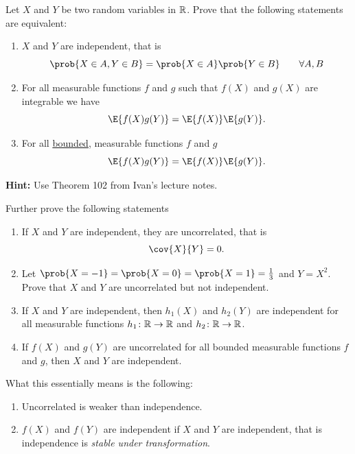 
\begin{exercise}[subtitle={Uncorrelated vs independent \Coffeecup\Coffeecup}]
   Let \(X\) and \(Y\) be two random variables in \(\mathbb{R}\). Prove that
   the following statements are equivalent:
   \begin{enumerate}[label=(\roman*),noitemsep]
        \item\label{it: independent} \(X\) and \(Y\) are independent, that is
        \[
            \prob{X \in A, Y \in B} = \prob{X \in A}\prob{Y \in B} \qquad \forall A, B
        \]
        \item\label{it: measurable functions} For all measurable functions \(f\) and \(g\) such that \(f(X)\)
        and \(g(X)\) are integrable we have
        \[
            \E{f(X)g(Y)} = \E{f(X)}\E{g(Y)}.
        \]
        \item\label{it: bounded measurable functions} For all \underline{bounded}, measurable functions \(f\) and \(g\)
        \[
            \E{f(X)g(Y)} = \E{f(X)}\E{g(Y)}.
        \]
   \end{enumerate}
   \textbf{Hint: } Use Theorem 102 from Ivan's lecture notes.
    
   \noindent Further prove the following statements
    \begin{enumerate}[label=(\alph*),noitemsep]
        \item\label{it: idep => uncor}
        If \(X\) and \(Y\) are independent, they are uncorrelated, that is
        \[
            \cov{X}{Y} = 0.
        \]

        \item\label{it: uncor not indep}
        Let \(\prob{X=-1} = \prob{X=0} = \prob{X=1} = \frac13\) and \(Y =
        X^2\). Prove that \(X\) and \(Y\) are uncorrelated but not independent.

        \item\label{it: indep stable under transformation}
        If \(X\) and \(Y\) are independent, then \(h_1(X)\) and \(h_2(Y)\) are independent
        for all measurable functions \(h_1\colon \mathbb{R} \to \mathbb{R}\) and \(h_2\colon \mathbb{R} \to \mathbb{R}\).

        \item\label{it: all transformations uncorrelated implies independence}
        If \(f(X)\) and \(g(Y)\) are uncorrelated for all bounded
        measurable functions \(f\) and \(g\), then \(X\) and \(Y\) are
        independent.
    \end{enumerate}

    \begin{remark}[Interpretation]
        What this essentially means is the following:
        \begin{enumerate}
            \item Uncorrelated is weaker than independence.
            \item \(f(X)\) and \(f(Y)\) are independent if \(X\) and \(Y\)
            are independent, that is independence is \emph{stable under transformation}.


\end{enumerate}
\end{remark}
\end{exercise}
